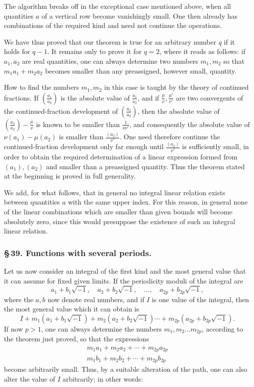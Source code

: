 \documentclass[10pt]{article}
\begin{document}
The algorithm breaks off in the exceptional case mentioned above, when all quantities \(a\) of a vertical row become vanishingly small. One then already has combinations of the required kind and need not continue the operations.

We have thus proved that our theorem is true for an arbitrary number \(q\) if it holds for \(q-1\). It remains only to prove it for \(q=2\), where it reads as follows: if \(a_1,a_2\) are real quantities, one can always determine two numbers \(m_1,m_2\) so that \(m_1a_1+m_2a_2\) becomes smaller than any preassigned, however small, quantity.

How to find the numbers \(m_1,m_2\) in this case is taught by the theory of continued fractions. If \(\left(\frac{a_1}{a_2}\right)\) is the absolute value of \(\frac{a_1}{a_2}\), and if \(\frac{\mu}{\nu},\frac{\mu'}{\nu'}\) are two convergents of the continued-fraction development of \(\left(\frac{a_1}{a_2}\right)\), then the absolute value of \(\left(\frac{a_1}{a_2}\right)-\frac{\mu}{\nu}\) is known to be smaller than \(\frac{1}{\nu\nu'}\), and consequently the absolute value of \(\nu(a_1)-\mu(a_2)\) is smaller than \(\frac{(a_2)}{\nu'}\). One need therefore continue the continued-fraction development only far enough until \(\frac{(a_2)}{\nu'}\) is sufficiently small, in order to obtain the required determination of a linear expression formed from \((a_1),(a_2)\) and smaller than a preassigned quantity. Thus the theorem stated at the beginning is proved in full generality.

We add, for what follows, that in general no integral linear relation exists between quantities \(a\) with the same upper index. For this reason, in general none of the linear combinations which are smaller than given bounds will become absolutely zero, since this would presuppose the existence of such an integral linear relation.

\subsubsection*{\S\,39. Functions with several periods.}

Let us now consider an integral of the first kind and the most general value that it can assume for fixed given limits. If the periodicity moduli of the integral are
\[
a_1+b_1\sqrt{-1},\quad a_2+b_2\sqrt{-1},\quad\ldots,\quad a_{2p}+b_{2p}\sqrt{-1},
\]
where the \(a,b\) now denote real numbers, and if \(I\) is one value of the integral, then the most general value which it can obtain is
\[
I+m_1(a_1+b_1\sqrt{-1})+m_2(a_2+b_2\sqrt{-1})\cdots+m_{2p}(a_{2p}+b_{2p}\sqrt{-1}).
\]
If now \(p>1\), one can always determine the numbers \(m_1,m_2\ldots m_{2p}\), according to the theorem just proved, so that the expressions
\[
\begin{array}{c}
m_1a_1+m_2a_2+\cdots+m_{2p}a_{2p}\\
m_1b_1+m_2b_2+\cdots+m_{2p}b_{2p}
\end{array}
\]
become arbitrarily small. Thus, by a suitable alteration of the path, one can also alter the value of \(I\) arbitrarily; in other words:
\end{document}
